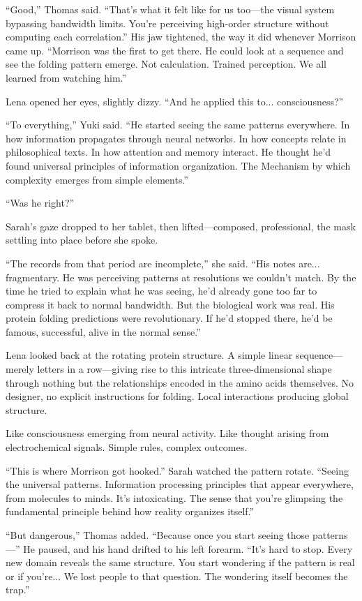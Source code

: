 ``Good,'' Thomas said. ``That's what it felt like for us too—the visual system bypassing bandwidth limits. You're perceiving high-order structure without computing each correlation.'' His jaw tightened, the way it did whenever Morrison came up. ``Morrison was the first to get there. He could look at a sequence and see the folding pattern emerge. Not calculation. Trained perception. We all learned from watching him.''

Lena opened her eyes, slightly dizzy. ``And he applied this to... consciousness?''

``To everything,'' Yuki said. ``He started seeing the same patterns everywhere. In how information propagates through neural networks. In how concepts relate in philosophical texts. In how attention and memory interact. He thought he'd found universal principles of information organization. The Mechanism by which complexity emerges from simple elements.''

``Was he right?''

Sarah's gaze dropped to her tablet, then lifted---composed, professional, the mask settling into place before she spoke.

``The records from that period are incomplete,'' she said. ``His notes are... fragmentary. He was perceiving patterns at resolutions we couldn't match. By the time he tried to explain what he was seeing, he'd already gone too far to compress it back to normal bandwidth. But the biological work was real. His protein folding predictions were revolutionary. If he'd stopped there, he'd be famous, successful, alive in the normal sense.''

Lena looked back at the rotating protein structure. A simple linear sequence—merely letters in a row—giving rise to this intricate three-dimensional shape through nothing but the relationships encoded in the amino acids themselves. No designer, no explicit instructions for folding. Local interactions producing global structure.

Like consciousness emerging from neural activity. Like thought arising from electrochemical signals. Simple rules, complex outcomes.

``This is where Morrison got hooked.'' Sarah watched the pattern rotate. ``Seeing the universal patterns. Information processing principles that appear everywhere, from molecules to minds. It's intoxicating. The sense that you're glimpsing the fundamental principle behind how reality organizes itself.''

``But dangerous,'' Thomas added. ``Because once you start seeing those patterns—'' He paused, and his hand drifted to his left forearm. ``It's hard to stop. Every new domain reveals the same structure. You start wondering if the pattern is real or if you're... We lost people to that question. The wondering itself becomes the trap.''

